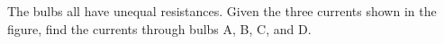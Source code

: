 The bulbs all have unequal resistances. Given the three
currents shown in the figure, find the currents through
bulbs A, B, C, and D.
